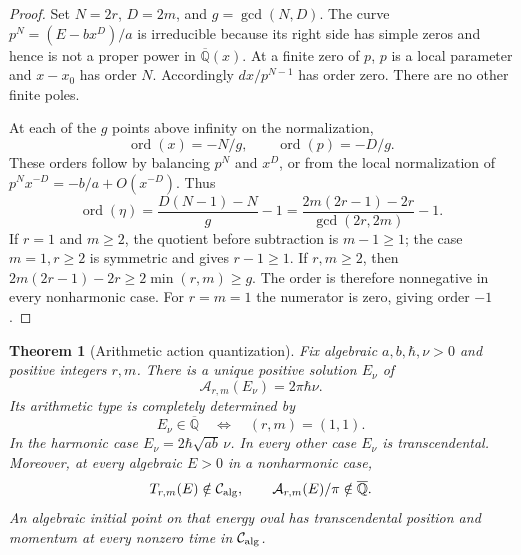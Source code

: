 \documentclass[11pt,a4paper]{article}
\newtheorem{theorem}{Theorem}[section]
\theoremstyle{definition}
\theoremstyle{remark}
\numberwithin{equation}{section}
\begin{document}
\begin{proof}
Set $N=2r$, $D=2m$, and $g=\gcd(N,D)$.  The curve
$p^N=(E-bx^D)/a$ is irreducible because its right side has simple
zeros and hence is not a proper power in $\overline{\mathbb Q}(x)$.
At a finite zero of $p$, $p$ is a local parameter and
$x-x_0$ has order $N$.  Accordingly $dx/p^{N-1}$ has order zero.
There are no other finite poles.

At each of the $g$ points above infinity on the normalization,
\[
 \operatorname{ord}(x)=-N/g,\qquad
 \operatorname{ord}(p)=-D/g.
\]
These orders follow by balancing $p^N$ and $x^D$, or from the local
normalization of $p^N x^{-D}=-b/a+O(x^{-D})$.
Thus
\begin{equation}\label{p1:pt:infinity-order}
 \operatorname{ord}(\eta)
 =\frac{D(N-1)-N}{g}-1
 =\frac{2m(2r-1)-2r}{\gcd(2r,2m)}-1.
\end{equation}
If $r=1$ and $m\ge2$, the quotient before subtraction is $m-1\ge1$;
the case $m=1,r\ge2$ is symmetric and gives $r-1\ge1$.
If $r,m\ge2$, then
$2m(2r-1)-2r\ge2\min(r,m)\ge g$.
The order is therefore nonnegative in every nonharmonic case.
For $r=m=1$ the numerator is zero, giving order $-1$.
\end{proof}

\begin{theorem}[Arithmetic action quantization]
\label{p1:pt:action-quantization}
Fix algebraic $a,b,\hbar,\nu>0$ and positive integers $r,m$.
There is a unique positive solution $E_\nu$ of
\begin{equation}\label{p1:pt:BS}
 \mathcal A_{r,m}(E_\nu)=2\pi\hbar\nu.
\end{equation}
Its arithmetic type is completely determined by
\[
 E_\nu\in\overline{\mathbb Q}
 \quad\Longleftrightarrow\quad (r,m)=(1,1).
\]
In the harmonic case $E_\nu=2\hbar\sqrt{ab}\,\nu$.
In every other case $E_\nu$ is transcendental.
Moreover, at every algebraic $E>0$ in a nonharmonic case,
\[
 T_{r,m}(E)\notin\mathcal C_{\rm alg},\qquad
 \mathcal A_{r,m}(E)/\pi\notin\overline{\mathbb Q}.
\]
An algebraic initial point on that energy oval has transcendental
position and momentum at every nonzero time in $\mathcal C_{\rm alg}$.
\end{theorem}
\end{document}
